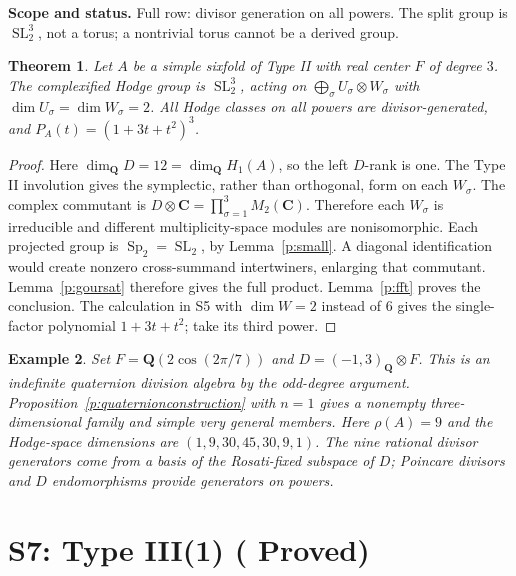 \documentclass[11pt,reqno]{article}
\theoremstyle{emphasizedplain}
\DeclareRobustCommand{\provedstatus}{%
  \texorpdfstring{\textcolor{ProvedGreen}{\textbf{Proved}}}{Proved}}
\newtheorem{theorem}{Theorem}[section]
\theoremstyle{emphasizeddefinition}
\newtheorem{example}[theorem]{Example}
\theoremstyle{emphasizeddefinition}
\DeclareMathOperator{\Sp}{Sp}
\DeclareMathOperator{\SL}{SL}
\newcommand{\Q}{\mathbf Q}
\newcommand{\C}{\mathbf C}
\newcommand{\status}[1]{%
  \par\nobreak\smallskip\noindent
  {\setlength{\fboxsep}{7pt}%
   \colorbox{ScopeBackground}{%
    \parbox{\dimexpr\linewidth-2\fboxsep\relax}{%
     \small\textbf{\textcolor{HeadingInk}{Scope and status.}} #1}}}%
  \par\nobreak\medskip}
\begin{document}
\status{Full row: divisor generation on all powers. The split group is
$\SL_2^3$, not a torus; a nontrivial torus cannot be a derived group.}
\begin{theorem}
Let $A$ be a simple sixfold of Type II with real center $F$ of degree $3$.
The complexified Hodge group is $\SL_2^3$, acting on
$\bigoplus_\sigma U_\sigma\otimes W_\sigma$ with
$\dim U_\sigma=\dim W_\sigma=2$. All Hodge classes on all powers are
divisor-generated, and $P_A(t)=(1+3t+t^2)^3$.
\end{theorem}
\begin{proof}
Here $\dim_\Q D=12=\dim_\Q H_1(A)$, so the left $D$-rank is one.
The Type II involution gives the symplectic, rather than orthogonal,
form on each $W_\sigma$. The complex commutant is
$D\otimes\C=\prod_{\sigma=1}^3M_2(\C)$.
Therefore each $W_\sigma$ is irreducible and different multiplicity-space
modules are nonisomorphic. Each projected group is $\Sp_2=\SL_2$, by
Lemma~\ref{p:small}. A diagonal identification would create nonzero
cross-summand intertwiners, enlarging that commutant. Lemma~\ref{p:goursat}
therefore gives the full product. Lemma~\ref{p:fft} proves the conclusion.
The calculation in S5 with $\dim W=2$ instead of $6$ gives the single-factor
polynomial $1+3t+t^2$; take its third power.
\end{proof}
\begin{example}
Set $F=\Q(2\cos(2\pi/7))$ and $D=(-1,3)_\Q\otimes F$. This is an
indefinite quaternion division algebra by the odd-degree argument.
Proposition~\ref{p:quaternionconstruction} with $n=1$ gives a nonempty
three-dimensional family and simple very general members.
Here $\rho(A)=9$ and the Hodge-space dimensions are
$(1,9,30,45,30,9,1)$. The nine rational divisor generators come from a
basis of the Rosati-fixed subspace of $D$; Poincare divisors and $D$
endomorphisms provide generators on powers.
\end{example}
\section{S7: Type III(1) (\provedstatus)}\label{sec:S7}
\end{document}
